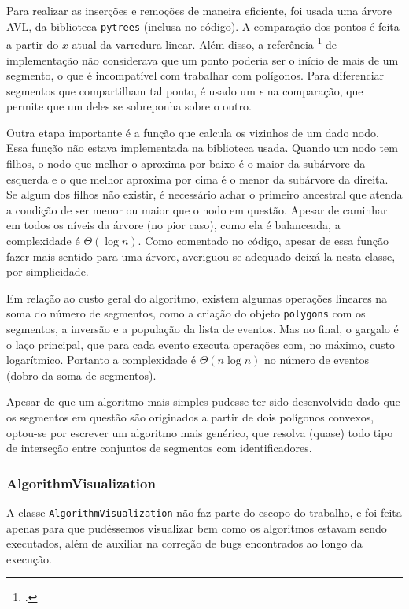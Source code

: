 \documentclass{article}
\begin{document}
Para realizar as inserções e remoções de maneira eficiente, foi usada uma árvore AVL, da biblioteca \texttt{pytrees} (inclusa no código). A comparação dos pontos é feita a partir do \( x \) atual da varredura linear. Além disso, a referência \footcite{SL18} de implementação não considerava que um ponto poderia ser o início de mais de um segmento, o que é incompatível com trabalhar com polígonos. Para diferenciar segmentos que compartilham tal ponto, é usado um \( \epsilon \) na comparação, que permite que um deles se sobreponha sobre o outro.

Outra etapa importante é a função que calcula os vizinhos de um dado nodo. Essa função não estava implementada na biblioteca usada. Quando um nodo tem filhos, o nodo que melhor o aproxima por baixo é o maior da subárvore da esquerda e o que melhor aproxima por cima é o menor da subárvore da direita. Se algum dos filhos não existir, é necessário achar o primeiro ancestral que atenda a condição de ser menor ou maior que o nodo em questão. Apesar de caminhar em todos os níveis da árvore (no pior caso), como ela é balanceada, a complexidade é \( \Theta(\log n) \). Como comentado no código, apesar de essa função fazer mais sentido para uma árvore, averiguou-se adequado deixá-la nesta classe, por simplicidade.

Em relação ao custo geral do algoritmo, existem algumas operações lineares na soma do número de segmentos, como a criação do objeto \texttt{polygons} com os segmentos, a inversão e a população da lista de eventos. Mas no final, o gargalo é o laço principal, que para cada evento executa operações com, no máximo, custo logarítmico. Portanto a complexidade é \( \Theta(n \log n) \) no número de eventos (dobro da soma de segmentos).

Apesar de que um algoritmo mais simples pudesse ter sido desenvolvido dado que os segmentos em questão são originados a partir de dois polígonos convexos, optou-se por escrever um algoritmo mais genérico, que resolva (quase) todo tipo de interseção entre conjuntos de segmentos com identificadores.

\subsubsection{AlgorithmVisualization}

A classe \texttt{AlgorithmVisualization} não faz parte do escopo do trabalho, e foi feita apenas para que pudéssemos visualizar bem como os algoritmos estavam sendo executados, além de auxiliar na correção de bugs encontrados ao longo da execução.
\end{document}
